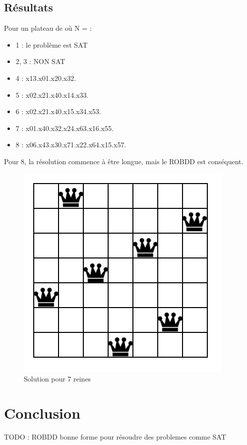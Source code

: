 \documentclass{article}
\begin{document}
\subsection{Résultats}
Pour un plateau de où N = :
\begin{itemize}
  \item 1 : le problème est SAT
  \item 2, 3 : NON SAT
  \item 4 : x13.x01.x20.x32.
  \item 5 : x02.x21.x40.x14.x33.
  \item 6 : x02.x21.x40.x15.x34.x53.
  \item 7 : x01.x40.x32.x24.x63.x16.x55.
  \item 8 : x06.x43.x30.x71.x22.x64.x15.x57.
\end{itemize}
Pour 8, la résolution commence à être longue, mais le ROBDD est conséquent.
\begin{figure}
	\begin{center}
		\includegraphics[scale=0.7]{sevenkingdom}\\
		Solution pour 7 reines
	\end{center}
\end{figure}
\section{Conclusion}
TODO : ROBDD bonne forme pour résoudre des problemes comme SAT
\end{document}
